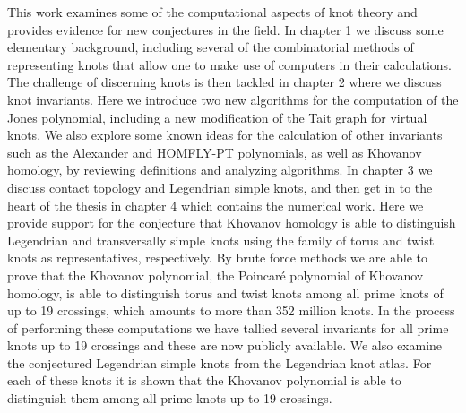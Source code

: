 This work examines some of the computational aspects of knot theory and
provides evidence for new conjectures in the field. In chapter 1 we discuss
some elementary background, including several of the combinatorial methods of
representing knots that allow one to make use of computers in their
calculations. The challenge of discerning knots is then tackled in chapter 2
where we discuss knot invariants. Here we introduce two new algorithms for the
computation of the Jones polynomial, including a new modification of the Tait
graph for virtual knots. We also explore some known ideas for the calculation
of other invariants such as the Alexander and HOMFLY-PT polynomials, as well as
Khovanov homology, by reviewing definitions and analyzing algorithms.
In chapter 3 we discuss contact topology and Legendrian
simple knots, and then get in to the heart of
the thesis in chapter 4 which contains the numerical work. Here we provide
support for the conjecture that Khovanov homology is able to distinguish
Legendrian and transversally simple knots using the family of torus and twist knots as
representatives, respectively. By brute force methods we are able to prove that
the Khovanov polynomial, the Poincar\'{e} polynomial of Khovanov homology, is
able to distinguish torus and twist knots among all prime knots of up to 19
crossings, which amounts to more than 352 million knots. In the process of
performing these computations we have tallied several invariants for all
prime knots up to 19 crossings and these are now publicly available. We also
examine the conjectured Legendrian simple knots from the Legendrian knot atlas.
For each of these knots it is shown that the Khovanov polynomial is able to
distinguish them among all prime knots up to 19 crossings.
